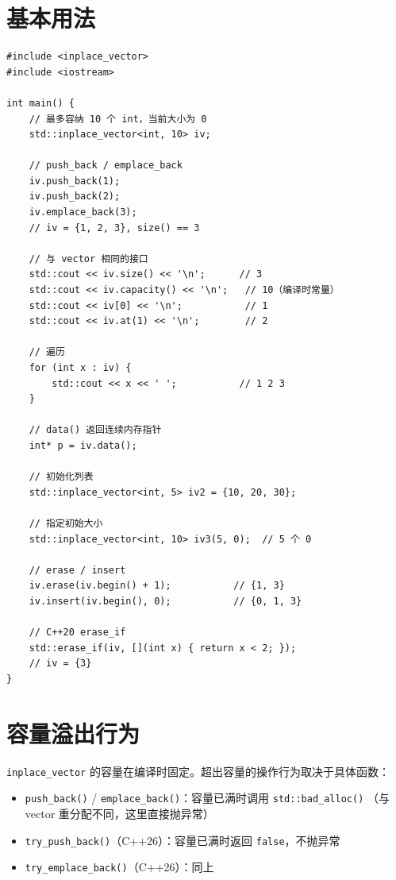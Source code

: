 \documentclass[12pt,a4paper,fontset=fandol]{ctexbook}
\newcommand{\cpp}[1]{C++#1}
\newcommand{\Fn}[1]{\texttt{#1()}}
\begin{document}
\section{基本用法}

\begin{lstlisting}
#include <inplace_vector>
#include <iostream>

int main() {
    // 最多容纳 10 个 int，当前大小为 0
    std::inplace_vector<int, 10> iv;

    // push_back / emplace_back
    iv.push_back(1);
    iv.push_back(2);
    iv.emplace_back(3);
    // iv = {1, 2, 3}, size() == 3

    // 与 vector 相同的接口
    std::cout << iv.size() << '\n';      // 3
    std::cout << iv.capacity() << '\n';   // 10（编译时常量）
    std::cout << iv[0] << '\n';           // 1
    std::cout << iv.at(1) << '\n';        // 2

    // 遍历
    for (int x : iv) {
        std::cout << x << ' ';           // 1 2 3
    }

    // data() 返回连续内存指针
    int* p = iv.data();

    // 初始化列表
    std::inplace_vector<int, 5> iv2 = {10, 20, 30};

    // 指定初始大小
    std::inplace_vector<int, 10> iv3(5, 0);  // 5 个 0

    // erase / insert
    iv.erase(iv.begin() + 1);           // {1, 3}
    iv.insert(iv.begin(), 0);           // {0, 1, 3}

    // C++20 erase_if
    std::erase_if(iv, [](int x) { return x < 2; });
    // iv = {3}
}
\end{lstlisting}

\section{容量溢出行为}

\begin{warning}
\texttt{inplace\_vector} 的容量在编译时固定。超出容量的操作行为取决于具体函数：
\begin{itemize}
\item \Fn{push\_back} / \Fn{emplace\_back}：容量已满时调用 \Fn{std::bad\_alloc}
  （与 vector 重分配不同，这里直接抛异常）
\item \Fn{try\_push\_back}（\cpp{26}）：容量已满时返回 \texttt{false}，不抛异常
\item \Fn{try\_emplace\_back}（\cpp{26}）：同上
\end{itemize}
\end{warning}
\end{document}
